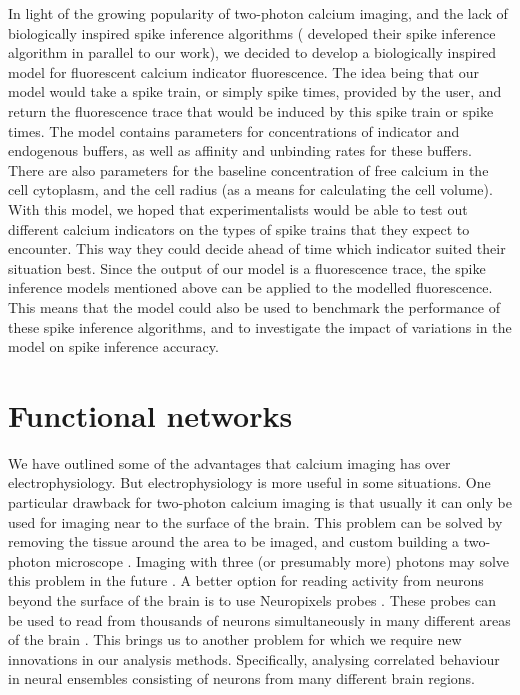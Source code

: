 In light of the growing popularity of two-photon calcium imaging, and the lack of biologically inspired spike inference algorithms (\parencite{greenberg} developed their spike inference algorithm in parallel to our work), we decided to develop a biologically inspired model for fluorescent calcium indicator fluorescence. The idea being that our model would take a spike train, or simply spike times, provided by the user, and return the fluorescence trace that would be induced by this spike train or spike times. The model contains parameters for concentrations of indicator and endogenous buffers, as well as affinity and unbinding rates for these buffers. There are also parameters for the baseline concentration of free calcium in the cell cytoplasm, and the cell radius (as a means for calculating the cell volume). With this model, we hoped that experimentalists would be able to test out different calcium indicators on the types of spike trains that they expect to encounter. This way they could decide ahead of time which indicator suited their situation best. Since the output of our model is a fluorescence trace, the spike inference models mentioned above can be applied to the modelled fluorescence. This means that the model could also be used to benchmark the performance of these spike inference algorithms, and to investigate the impact of variations in the model on spike inference accuracy.

\section{Functional networks}

We have outlined some of the advantages that calcium imaging has over electrophysiology. But electrophysiology is more useful in some situations. One particular drawback for two-photon calcium imaging is that usually it can only be used for imaging near to the surface of the brain. This problem can be solved by removing the tissue around the area to be imaged, and custom building a two-photon microscope \cite{dombeck}. Imaging with three (or presumably more) photons may solve this problem in the future \parencite{ouzounov}. A better option for reading activity from neurons beyond the surface of the brain is to use Neuropixels probes \parencite{jun}. These probes can be used to read from thousands of neurons simultaneously in many different areas of the brain \parencite{allen, stringer, steinmetz, steinmetz2019}. This brings us to another problem for which we require new innovations in our analysis methods. Specifically, analysing correlated behaviour in neural ensembles consisting of neurons from many different brain regions.

